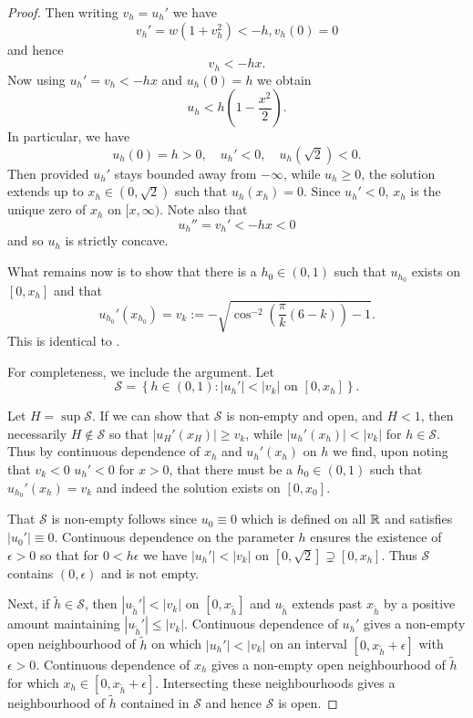 \documentclass[11pt]{amsart}
\begin{document}
\begin{proof}
Then writing \(v_h = u_h'\) we have
\[
v_h' = w (1 + v_h^2) < -h, v_h(0) = 0
\]
and hence
\[
v_h < -h x.
\]
Now using \(u_h' = v_h < -h x\) and \(u_h(0) = h\) we obtain
\[
u_h < h \left(1 - \frac{x^2}{2}\right).
\]
In particular, we have
\[
u_h(0) = h > 0, \quad u_h' < 0, \quad u_h(\sqrt{2}) < 0.
\]
Then provided \(u_h'\) stays bounded away from \(-\infty\), while \(u_h \geq 0\), the solution extends up to \(x_h \in (0, \sqrt{2})\) such that \(u_h(x_h) = 0\). Since \(u_h' < 0\), \(x_h\) is the unique zero of \(x_h\) on \([x, \infty)\). Note also that
\[
u_h'' = v_h' < -hx < 0
\]
and so \(u_h\) is strictly concave.

What remains now is to show that there is a \(h_0 \in (0, 1)\) such that \(u_{h_0}\) exists on \([0, x_h]\) and that
\[
u_{h_0}'(x_{h_0}) = v_k := -\sqrt{\cos^{-2} \left(\frac{\pi}{k}(6 - k)\right) - 1}.
\]
This is identical to \cite[Proposition 5.1]{MR2763716}.

For completeness, we include the argument. Let
\[
\mathcal{S} = \left\{h \in (0, 1) : |u_h'| < |v_k| \text{ on } [0, x_h]\right\}.
\]

Let \(H = \sup \mathcal{S}\). If we can show that \(\mathcal{S}\) is non-empty and open, and \(H < 1\), then necessarily \(H \notin \mathcal{S}\) so that \(|u_H'(x_H)| \geq v_k\), while \(|u_h'(x_h)| < |v_k|\) for \(h \in \mathcal{S}\). Thus by continuous dependence of \(x_h\) and \(u_h'(x_h)\) on \(h\) we find, upon noting that \(v_k < 0\) \(u_h' < 0\) for \(x > 0\), that there must be a \(h_0 \in (0, 1)\) such that \(u_{h_0}'(x_h) = v_k\) and indeed the solution exists on \([0, x_0]\).

That \(\mathcal{S}\) is non-empty follows since \(u_0 \equiv 0\) which is defined on all \(\mathbb{R}\) and satisfies \(|u_0'| \equiv 0\). Continuous dependence on the parameter \(h\) ensures the existence of \(\epsilon > 0\) so that for \(0 < h \epsilon\) we have \(|u_h'| < |v_k|\) on \([0, \sqrt{2}] \supsetneq [0, x_h]\). Thus \(\mathcal{S}\) contains \((0, \epsilon)\) and is not empty.

Next, if \(\tilde{h} \in \mathcal{S}\), then \(|u_{\tilde{h}}'| < |v_k|\) on \([0, x_{\tilde{h}}]\) and \(u_{\tilde{h}}\) extends past \(x_{\tilde{h}}\) by a positive amount maintaining \(|u_{\tilde{h}}'| \leq |v_k|\). Continuous dependence of \(u_h'\) gives a non-empty open neighbourhood of \(\tilde{h}\) on which \(|u_h'| < |v_k|\) on an interval \([0, x_{\tilde{h}} + \epsilon]\) with \(\epsilon > 0\). Continuous dependence of \(x_h\) gives a non-empty open neighbourhood of \(\tilde{h}\) for which \(x_h \in [0, x_{\tilde{h}} + \epsilon]\). Intersecting these neighbourhoods gives a neighbourhood of \(\tilde{h}\) contained in \(\mathcal{S}\) and hence \(\mathcal{S}\) is open.


\end{proof}
\end{document}

